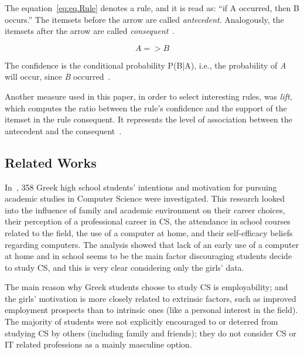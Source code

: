 The equation~\ref{eq:eq.Rule} denotes a rule, and it is read as: ``if A occurred, then B occurs.'' The itemsets before the arrow are called \emph{antecedent}. Analogously, the itemsets after the arrow are called \emph{consequent}~\cite{Hastie2009}.

\begin{equation}
{A} => {B}
\label{eq:eq.Rule}%
\end{equation}

The confidence is the conditional probability P(B|A), i.e., the probability of \emph{A} will occur, since \emph{B} occurred~\cite{Hastie2009}.

Another measure used in this paper, in order to select interesting rules, was \emph{lift}, which computes the ratio between the rule's confidence and the support of the itemset in the rule consequent. It represents the level of association between the antecedent and the consequent~\cite{tan2006introduction}.


%

\subsection{Related Works}\label{sec:background:related}%

In~\cite{papastergiou_are_2008}, 358 Greek high school students' intentions and motivation for pursuing academic studies in Computer Science were investigated. This research looked into the influence of family and academic environment on their career choices, their perception of a professional career in CS, the attendance in school courses related to the field, the use of a computer at home, and their self-efficacy beliefs regarding computers. The analysis showed that lack of an early use of a computer at home and in school seems to be the main factor discouraging students decide to study CS, and this is very clear considering only the girls' data.

The main reason why Greek students choose to study CS is employability; and the girls' motivation is more closely related to extrinsic factors, such as improved employment prospects than to intrinsic ones (like a personal interest in the field). The majority of students were not explicitly encouraged to or deterred from studying CS by others (including family and friends); they do not consider CS or IT related professions as a mainly masculine option.

